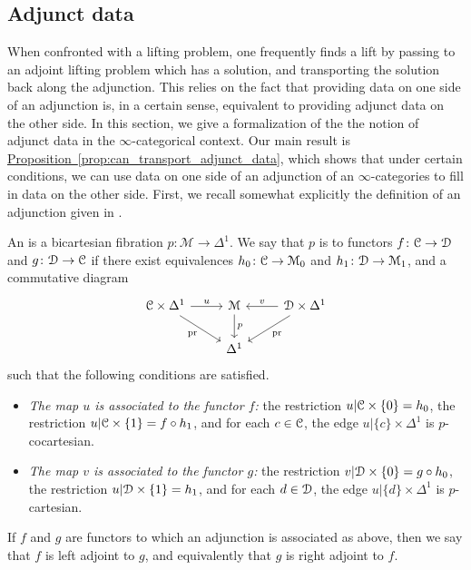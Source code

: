 \documentclass[main.tex]{subfiles}
\begin{document}
\subsection{Adjunct data}
\label{ssc:adjunct_data}

When confronted with a lifting problem, one frequently finds a lift by passing to an adjoint lifting problem which has a solution, and transporting the solution back along the adjunction. This relies on the fact that providing data on one side of an adjunction is, in a certain sense, equivalent to providing adjunct data on the other side. In this section, we give a formalization of the the notion of adjunct data in the $\infty$-categorical context. Our main result is \hyperref[prop:can_transport_adjunct_data]{Proposition~\ref*{prop:can_transport_adjunct_data}}, which shows that under certain conditions, we can use data on one side of an adjunction of an $\infty$-categories to fill in data on the other side. First, we recall somewhat explicitly the definition of an adjunction given in \cite{highertopostheory}.

\begin{definition}
  \label{def:adjunction}
  An  is a bicartesian fibration $p\colon \mathcal{M} \to \Delta^{1}$. We say that $p$ is  to functors $f\colon \mathcal{C} \to \mathcal{D}$ and $g\colon \mathcal{D} \to \mathcal{C}$ if there exist equivalences $h_{0}\colon \mathcal{C} \to \mathcal{M}_{0}$ and $h_{1}\colon \mathcal{D} \to \mathcal{M}_{1}$, and a commutative diagram
  \begin{equation*}
    \begin{tikzcd}
      \category{C} \times \Delta^{1}
      \arrow[r, "u"]
      \arrow[dr, swap, "\pr"]
      & \mathcal{M}
      \arrow[d, "p"]
      & \category{D} \times \Delta^{1}
      \arrow[l, swap, "v"]
      \arrow[dl, "\pr"]
      \\
      & \Delta^{1}
    \end{tikzcd}
  \end{equation*}
  such that the following conditions are satisfied.
  \begin{itemize}
    \item \emph{The map $u$ is associated to the functor $f$:} the restriction $u|\mathcal{C} \times \{0\} = h_{0}$, the restriction $u|\mathcal{C} \times \{1\} = f \circ h_{1}$, and for each $c \in \mathcal{C}$, the edge $u|\{c\} \times \Delta^{1}$ is $p$-cocartesian.

    \item \emph{The map $v$ is associated to the functor $g$:} the restriction $v|\mathcal{D} \times \{0\} = g \circ h_{0}$, the restriction $u|\mathcal{D} \times \{1\} = h_{1}$, and for each $d \in \mathcal{D}$, the edge $u|\{d\} \times \Delta^{1}$ is $p$-cartesian.
  \end{itemize}

  If $f$ and $g$ are functors to which an adjunction is associated as above, then we say that $f$ is left adjoint to $g$, and equivalently that $g$ is right adjoint to $f$.
\end{definition}
\end{document}
